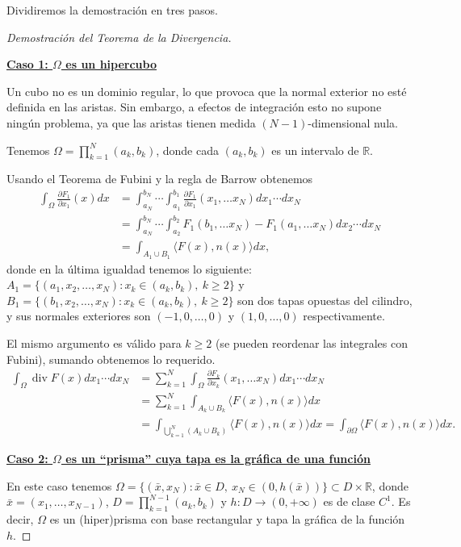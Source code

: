 \documentclass[12pt,spanish]{article}
\theoremstyle{definition}
\theoremstyle{remark}
\begin{document}
Dividiremos la demostración en tres pasos.

\begin{proof}[Demostración del Teorema de la Divergencia] ~
	
	\underline{\textbf{Caso 1: $\Omega$ es un hipercubo}}
	
	Un cubo no es un dominio regular, lo que provoca que la normal exterior no esté definida en las aristas. Sin embargo, a efectos de integración esto no supone ningún problema, ya que las aristas tienen medida $(N-1)$-dimensional nula.
	
	Tenemos $\displaystyle{\Omega=\prod_{k=1}^{N}(a_k,b_k)}$, donde cada $(a_k,b_k)$ es un intervalo de $\mathbb{R}$.
	
	Usando el Teorema de Fubini y la regla de Barrow obtenemos
	\begin{align*}
	\int_\Omega \frac{\partial F_1}{\partial x_1}(x)dx&=\int_{a_N}^{b_N}\cdots\int_{a_1}^{b_1}\frac{\partial F_1}{\partial x_1}(x_1,\ldots x_N) dx_1\cdots dx_N \\ &=\int_{a_N}^{b_N}\cdots\int_{a_2}^{b_2}F_1(b_1,\ldots x_N)-F_1(a_1,\ldots x_N) dx_2\cdots dx_N \\ &=\int_{A_1\cup B_1}\langle F(x),n(x)\rangle dx,
	\end{align*}
	donde en la última igualdad tenemos lo siguiente: $A_1=\{(a_1,x_2,\ldots,x_N): x_k\in(a_k,b_k), \ k\geq 2\}$ y $B_1=\{(b_1,x_2,\ldots,x_N): x_k\in(a_k,b_k), \ k\geq 2\}$ son dos tapas opuestas del cilindro, y sus normales exteriores son $(-1,0,\ldots,0)$ y $(1,0,\ldots,0)$ respectivamente.
	
	El mismo argumento es válido para $k\geq 2$ (se pueden reordenar las integrales con Fubini), sumando obtenemos lo requerido.
	\begin{align*}
	\int_\Omega\operatorname{div}F(x) dx_1\cdots dx_N&=\sum_{k=1}^N \int_\Omega\frac{\partial F_k}{\partial x_k}(x_1,\ldots x_N) dx_1\cdots dx_N \\
	&=\sum_{k=1}^N\int_{A_k\cup B_k}\langle F(x),n(x)\rangle dx \\ &=\int_{\bigcup\limits_{k=1}^N (A_k\cup B_k)}\langle F(x),n(x)\rangle dx=\int_{\partial\Omega}\langle F(x),n(x)\rangle dx.
	\end{align*}
	
	\underline{\textbf{Caso 2: $\Omega$ es un ``prisma'' cuya tapa es la gráfica de una función}}
	
	En este caso tenemos $\Omega=\{(\bar{x},x_N):\bar{x}\in D, \ x_N\in (0,h(\bar{x}))\}\subset D\times\mathbb{R}$, donde $\bar{x}=(x_1,\ldots,x_{N-1})$, $\displaystyle{D=\prod_{k=1}^{N-1}(a_k,b_k)}$ y $h:D\rightarrow(0,+\infty)$ es de clase $C^1$.
	Es decir, $\Omega$ es un (hiper)prisma con base rectangular y tapa la gráfica de la función $h$.
	

\end{proof}
\end{document}
